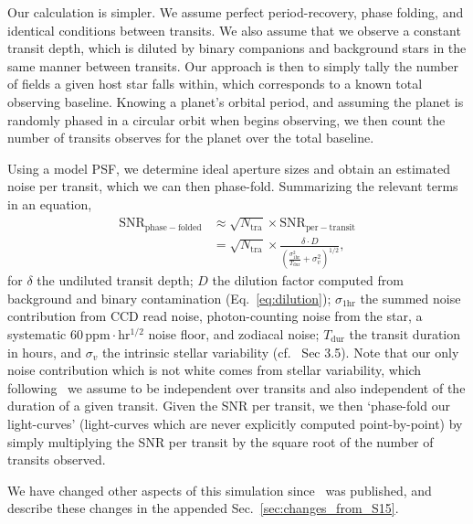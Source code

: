 Our calculation is simpler.  We assume perfect period-recovery, phase
folding, and identical conditions between transits.  We also assume
that we observe a constant transit depth, which is diluted by binary
companions and background stars in the same manner between transits.
Our approach is then to simply tally the number of \tess fields a
given host star falls within, which corresponds to a known total
observing baseline.  Knowing a planet's orbital period, and assuming the
planet is randomly phased in a circular orbit when \tess begins observing, 
we then count the number of transits \tess observes for the planet over the 
total baseline.

Using a model PSF, we determine ideal aperture sizes and obtain 
an estimated noise per transit, which we can then phase-fold. 
Summarizing the relevant terms in an equation,
\begin{align}
    \mathrm{SNR}_\mathrm{phase-folded} &\approx
	\sqrt{N_\mathrm{tra}} \times \mathrm{SNR}_\mathrm{per-transit}\nonumber \\
	 &= \sqrt{N_\mathrm{tra}} \times 
	\frac{\delta \cdot D}{\left(\frac{\sigma_\mathrm{1hr}^2}{T_\mathrm{dur}} 
		+ \sigma_v^2 \right)^{1/2}}, 
	\label{eq:snr} 
\end{align}
for $\delta$ the undiluted transit depth; $D$ the dilution factor
computed from background and binary contamination (Eq.~\ref{eq:dilution});
$\sigma_\mathrm{1hr}$ the summed noise contribution from CCD read noise, 
photon-counting noise from the star, a systematic 
$60\,\mathrm{ppm\cdot hr^{1/2}}$ noise floor, and zodiacal noise;
$T_\mathrm{dur}$ the transit duration in hours, and $\sigma_v$ the intrinsic
stellar variability (cf.~ Sec 3.5).
Note that our only noise contribution which is not white comes from stellar 
variability, 
which following~ we assume to be independent over 
transits and also independent of the duration of a given transit.
Given the SNR per transit, we then `phase-fold our light-curves' 
(light-curves which are never explicitly computed point-by-point) by simply
multiplying the SNR per transit by the square root of the number of transits
observed.

We have changed other aspects of this simulation
since~ was published, and describe these
changes in the appended Sec.~\ref{sec:changes_from_S15}.
